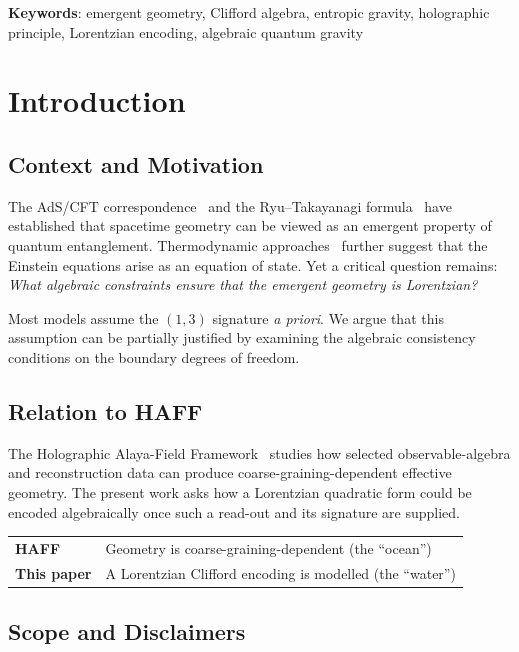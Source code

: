 \documentclass[12pt,a4paper,openany]{book}
\begin{document}
\medskip
\noindent\textbf{Keywords}: emergent geometry, Clifford algebra, entropic gravity, holographic principle, Lorentzian encoding, algebraic quantum gravity


\section{Introduction}
\label{A-sec:intro}

\subsection{Context and Motivation}

The AdS/CFT correspondence~\cite{Maldacena1999} and the Ryu--Takayanagi formula~\cite{RyuTakayanagi2006} have established that spacetime geometry can be viewed as an emergent property of quantum entanglement.
Thermodynamic approaches~\cite{Jacobson1995,Verlinde2011} further suggest that the Einstein equations arise as an equation of state.
Yet a critical question remains: \textit{What algebraic constraints ensure that the emergent geometry is Lorentzian?}

Most models assume the $(1,3)$ signature \textit{a priori}.
We argue that this assumption can be partially justified by examining the algebraic consistency conditions on the boundary degrees of freedom.

\subsection{Relation to HAFF}

The Holographic Alaya-Field Framework~\cite{Liu2026PaperA,Liu2026PaperB} studies how selected observable-algebra and reconstruction data can produce coarse-graining-dependent effective geometry.
The present work asks how a Lorentzian quadratic form could be encoded algebraically once such a read-out and its signature are supplied.

\begin{center}
\begin{tabular}{ll}
\textbf{HAFF} & Geometry is coarse-graining-dependent (the ``ocean'') \\
\textbf{This paper} & A Lorentzian Clifford encoding is modelled (the ``water'')
\end{tabular}
\end{center}

\subsection{Scope and Disclaimers}
\end{document}
